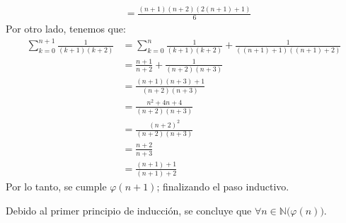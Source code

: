 \documentclass[letterpaper,DIV=14,headsepline,12pt]{scrartcl}
\makeatletter
\renewenvironment{proof}[1][]{%
        \par\pushQED{\qed}%
        \normalfont\topsep6pt \partopsep0pt %
        \trivlist
        \item[\hskip\labelsep
                \textbf{\textit{Demostración.}}%
        ]#1
        }{%
        \popQED\endtrivlist\@endpefalse
    }
\makeatother
\begin{document}
\begin{proof}
\begin{enumerate}[\hspace{1cm}]
\begin{align*}
                &= \frac{(n+1)(n+2)(2(n+1)+1)}{6}
            \end{align*}
            Por otro lado, tenemos que:
            \begin{align*}
                \sum_{k=0}^{n+1} \frac{1}{(k+1)(k+2)} &= \sum_{k=0}^{n} \frac{1}{(k+1)(k+2)} + \frac{1}{((n+1)+1)((n+1)+2)} \\
                &= \frac{n+1}{n+2} + \frac{1}{(n+2)(n+3)} \tag{por H.I.} \\
                &= \frac{(n+1)(n+3) + 1}{(n+2)(n+3)} \\
                &= \frac{n^2 + 4n + 4}{(n+2)(n+3)} \\
                &= \frac{(n+2)^2}{(n+2)(n+3)} \\
                &= \frac{n+2}{n+3} \\
                &= \frac{(n+1)+1}{(n+1)+2}
            \end{align*}
            Por lo tanto, se cumple $\varphi(n+1)$; finalizando el paso inductivo.
        \end{enumerate}
        Debido al primer principio de inducción, se concluye que $\forall n \in \mathbb{N} \big( \varphi(n) \big)$.
    \end{proof}
\end{document}
